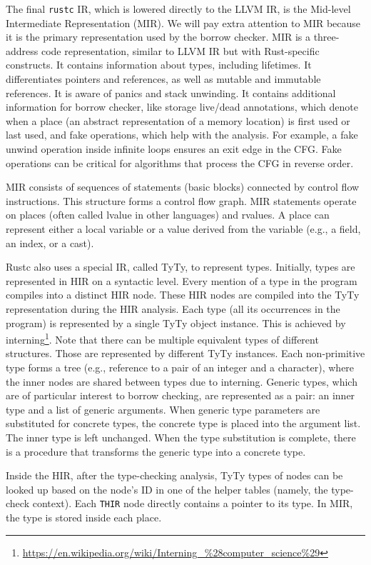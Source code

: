 \documentclass[
  11pt,
  twoside,symmetric]{report}
\DeclareRobustCommand{\href}[2]{#2\footnote{\url{#1}}}
\begin{document}
The final \texttt{rustc} IR, which is lowered directly to the LLVM IR,
is the Mid-level Intermediate Representation (MIR). We will pay extra
attention to MIR because it is the primary representation used by the
borrow checker. MIR is a three-address code representation, similar to
LLVM IR but with Rust-specific constructs. It contains information about
types, including lifetimes. It differentiates pointers and references,
as well as mutable and immutable references. It is aware of panics and
stack unwinding. It contains additional information for borrow checker,
like storage live/dead annotations, which denote when a place (an
abstract representation of a memory location) is first used or last
used, and fake operations, which help with the analysis. For example, a
fake unwind operation inside infinite loops ensures an exit edge in the
CFG. Fake operations can be critical for algorithms that process the CFG
in reverse order.

MIR consists of sequences of statements (basic blocks) connected by
control flow instructions. This structure forms a control flow graph.
MIR statements operate on places (often called lvalue in other
languages) and rvalues. A place can represent either a local variable or
a value derived from the variable (e.g., a field, an index, or a cast).

Rustc also uses a special IR, called TyTy, to represent types.
Initially, types are represented in HIR on a syntactic level. Every
mention of a type in the program compiles into a distinct HIR node.
These HIR nodes are compiled into the TyTy representation during the HIR
analysis. Each type (all its occurrences in the program) is represented
by a single TyTy object instance. This is achieved by
\href{https://en.wikipedia.org/wiki/Interning_\%28computer_science\%29}{interning}.
Note that there can be multiple equivalent types of different
structures. Those are represented by different TyTy instances. Each
non-primitive type forms a tree (e.g., reference to a pair of an integer
and a character), where the inner nodes are shared between types due to
interning. Generic types, which are of particular interest to borrow
checking, are represented as a pair: an inner type and a list of generic
arguments. When generic type parameters are substituted for concrete
types, the concrete type is placed into the argument list. The inner
type is left unchanged. When the type substitution is complete, there is
a procedure that transforms the generic type into a concrete type.

Inside the HIR, after the type-checking analysis, TyTy types of nodes
can be looked up based on the node's ID in one of the helper tables
(namely, the type-check context). Each \texttt{THIR} node directly
contains a pointer to its type. In MIR, the type is stored inside each
place.
\end{document}
